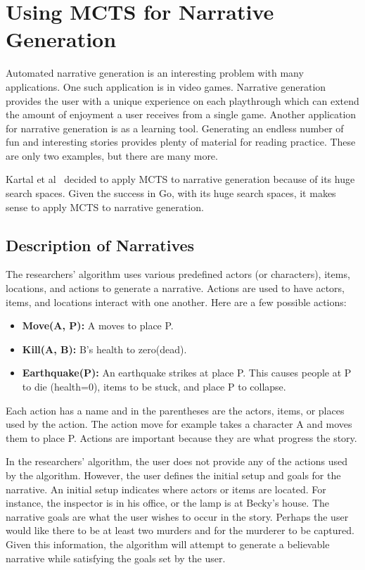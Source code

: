 \documentclass{sig-alternate}
\begin{document}
\section{Using MCTS for Narrative Generation}
Automated narrative generation is an interesting problem with many applications. One such application is in video games. Narrative generation provides the user with a unique experience on each playthrough which can extend the amount of enjoyment a user receives from a single game. Another application for narrative generation is as a learning tool. Generating an endless number of fun and interesting stories provides plenty of material for reading practice. These are only two examples, but there are many more.

Kartal et al~\cite{Narrative} decided to apply MCTS to narrative generation because of its huge search spaces. Given the success in Go, with its huge search spaces, it makes sense to apply MCTS to narrative generation.
\subsection{Description of Narratives}

The researchers' algorithm uses various predefined actors (or characters), items, locations, and actions to generate a narrative. Actions are used to have actors, items, and locations interact with one another. Here are a few possible actions:
\begin{itemize}
\item \textbf{Move(A, P):} A moves to place P.
\item \textbf{Kill(A, B):} B's health to zero(dead).
\item \textbf{Earthquake(P):} An earthquake strikes at place P. This causes people at P to die (health=0), items to be stuck, and place P to collapse.
\end{itemize}
Each action has a name and in the parentheses are the actors, items, or places used by the action. The action move for example takes a character A and moves them to place P. Actions are important because they are what progress the story. 

In the researchers' algorithm, the user does not provide any of the actions used by the algorithm. However, the user defines the initial setup and goals for the narrative. An initial setup indicates where actors or items are located. For instance, the inspector is in his office, or the lamp is at Becky's house. The narrative goals are what the user wishes to occur in the story. Perhaps the user would like there to be at least two murders and for the murderer to be captured. Given this information, the algorithm will attempt to generate a believable narrative while satisfying the goals set by the user.
\end{document}
